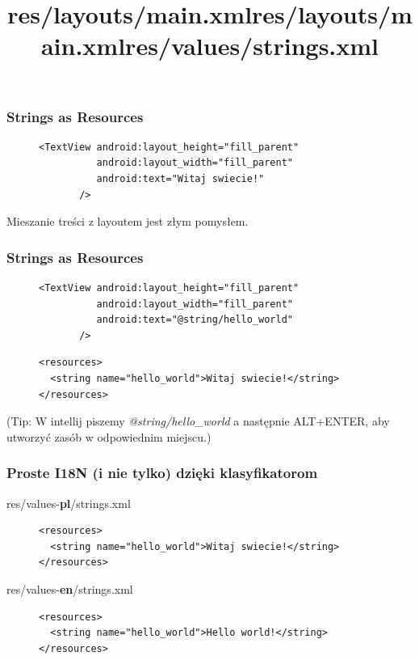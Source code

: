 \begin{frame}[fragile]\frametitle{Strings as Resources}
\begin{figure}
\title{res/layouts/main.xml}
\begin{lstlisting}
<TextView android:layout_height="fill_parent"
          android:layout_width="fill_parent"
          android:text="Witaj swiecie!"
       />
\end{lstlisting}
\end{figure}

Mieszanie treści z layoutem jest złym pomysłem.
\end{frame}

\begin{frame}[fragile]\frametitle{Strings as Resources}
\begin{figure}
\title{res/layouts/main.xml}
\begin{lstlisting}
<TextView android:layout_height="fill_parent"
          android:layout_width="fill_parent"
          android:text="@string/hello_world"
       />
\end{lstlisting}
\end{figure}

\begin{figure}
 \title{res/values/strings.xml}
\begin{lstlisting}
<resources>
  <string name="hello_world">Witaj swiecie!</string>
</resources>
\end{lstlisting}
\end{figure}

(Tip: W intellij piszemy \textit{@string/hello\_world} a następnie ALT+ENTER, aby utworzyć zasób w odpowiednim miejscu.)
\end{frame}

\begin{frame}[fragile]\frametitle{Proste I18N (i nie tylko) dzięki klasyfikatorom}

\centering
\ttfamily 
res/values-\textbf{pl}/strings.xml

\begin{figure}
\begin{lstlisting}
<resources>
  <string name="hello_world">Witaj swiecie!</string>
</resources>
\end{lstlisting}
\end{figure}

\centering
\ttfamily 
res/values-\textbf{en}/strings.xml
\begin{figure}
\begin{lstlisting}
<resources>
  <string name="hello_world">Hello world!</string>
</resources>
\end{lstlisting}
\end{figure}


\end{frame}


